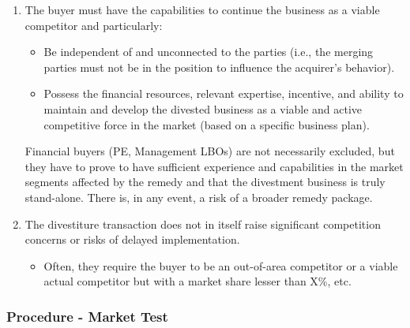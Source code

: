         \begin{enumerate}[label=(\alph*)]
            \item The buyer must have the capabilities to continue the business as a viable competitor and particularly:
            \begin{itemize}
                \item Be independent of and unconnected to the parties (i.e., the merging parties must not be in the position to influence the acquirer’s behavior).
                \item Possess the financial resources, relevant expertise, incentive, and ability to maintain and develop the divested business as a viable and active competitive force in the market (based on a specific business plan).
            \end{itemize}
            Financial buyers (PE, Management LBOs) are not necessarily excluded, but they have to prove to have sufficient experience and capabilities in the market segments affected by the remedy and that the divestment business is truly stand-alone. There is, in any event, a risk of a broader remedy package.
            \item The divestiture transaction does not in itself raise significant competition concerns or risks of delayed implementation.
            \begin{itemize}
                \item Often, they require the buyer to be an out-of-area competitor or a viable actual competitor but with a market share lesser than X\%, etc.
            \end{itemize}
        \end{enumerate}



        \subsubsection{Procedure - Market Test}

